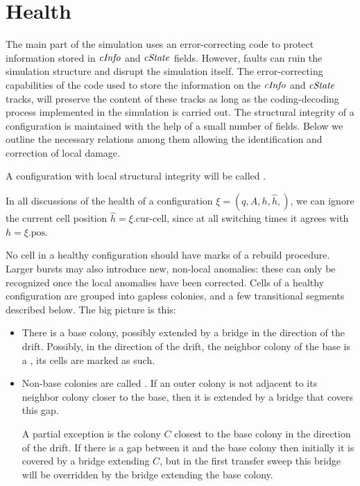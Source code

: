 \documentclass[12pt]{memoir}
\newcommand{\authnote}[3]
{\text{{ \textcolor{#3}{\( \langle\hspace{-0.2em}\langle \)\textsf{\footnotesize #1: #2}\( \rangle\hspace{-0.2em}\rangle \)}}}}
\newcommand{\authnote}[2]{}
\newcommand{\Pnote}[1]{{\authnote{P}{#1}{cyan}}}
\newcommand{\fld}[1]{\ensuremath{\textit{#1\/}}}
\newcommand{\h}{h}
\newcommand{\hc}{\hat h}
\newcommand{\pos}{\mathrm{pos}}
\newcommand{\curcell}{\textrm{cur-cell}}
\newcommand{\cInfo}{\fld{cInfo}}
\newcommand{\cState}{\fld{cState}}
\begin{document}
\section{Health}            \label{sec:health}

The main part of the simulation uses an error-correcting
code to protect information stored in \( \cInfo \) and \( \cState \) fields.
However, faults can ruin the simulation structure and disrupt the simulation itself.
The error-correcting capabilities of the code 
used to store the information on the \( \cInfo \) and
\( \cState \) tracks, will preserve the content of these tracks as long as the coding-decoding
process implemented in the simulation is carried out.
The structural integrity of a configuration is maintained with the help of a small number
of fields.
Below we outline the necessary relations among them 
allowing the identification and correction of local damage.

A configuration with local structural integrity will be called .
\begin{sloppypar}
\begin{remark}
In all discussions of the health of a configuration \( \xi=(q,A,\h,\hc,) \), we can ignore
the current cell position \( \hc=\xi.\curcell \), since at all switching times 
it agrees with \( \h=\xi.\pos \).
\end{remark}
  \end{sloppypar}

No cell in a healthy configuration should have marks of a rebuild procedure.
Larger bursts may also introduce new, non-local anomalies: these can only be recognized
once the local anomalies have been corrected.
Cells of a healthy configuration are grouped into gapless colonies, and 
a few transitional segments described below.
The big picture is this:
\begin{itemize}
\item There is a base colony, possibly extended by a bridge in the direction of
  the drift.
Possibly, in the direction of the drift, the neighbor colony of the base is a 
, its cells are marked as such.
\item Non-base colonies are called .
If an outer colony is not adjacent to its neighbor colony closer to the base,
then it is extended by a bridge that covers this gap.

A partial exception is the colony \( C \) closest to the base colony in the direction of the
drift.
If there is a gap between it and the base colony then initially it is covered by 
a bridge extending \( C \), but in the first transfer sweep this bridge will be
overridden by the bridge extending the base colony.
\end{itemize}
\Pnote{Pictures!}
\end{document}
